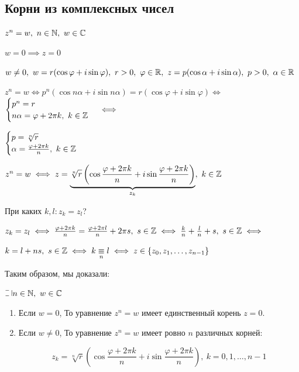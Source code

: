\begin{normalsize}

\section{Корни из комплексных чисел}

$z^n = w,~n \in \mathbb{N},~w \in \mathbb{C}$

$w = 0 \implies z = 0$

$w \neq 0,~w = r (\cos \varphi + i \sin \varphi),~r > 0,~\varphi \in \mathbb{R},~z = p (\cos \alpha + i \sin \alpha),~p > 0,~\alpha \in \mathbb{R}$

$z^n = w \iff p^n (\cos n \alpha + i \sin n \alpha) = r (\cos \varphi + i \sin \varphi) \iff$
$\begin{cases}
    p^n = r\\
    n \alpha = \varphi + 2 \pi k,~k \in \mathbb{Z}
\end{cases} \iff$

$\begin{cases}
    p = \sqrt[n]{r}\\
    \alpha = \frac{\varphi + 2 \pi k}{n},~k \in \mathbb{Z}
\end{cases}$

$z^n = w \iff z = \underbrace{\sqrt[n]{r} \left(\cos \frac{\varphi + 2 \pi k}{n} + i \sin \frac{\varphi + 2 \pi k}{n}\right)}_{z_k},~k \in \mathbb{Z}$

При каких $k, l: z_k = z_l$?

$z_k = z_l \iff \frac{\varphi + 2 \pi k}{n} = \frac{\varphi + 2 \pi l}{n} + 2 \pi s,~s \in \mathbb{Z} \iff \frac{k}{n} + \frac{l}{n} + s,~s \in \mathbb{Z} \iff $  

$k = l + ns,~s \in \mathbb{Z} \iff k \underset{n}{\equiv} l \iff z \in \{z_0, z_1, \ldots, z_{n-1}\}$

Таким образом, мы доказали:

\begin{theorem}
    $\letus n \in \mathN,~w \in \mathC$

    \begin{enumerate}
        \item Если $w = 0$, То уравнение $z^n = w$ имеет единственный корень $z = 0$.
        
        \item Если $w \neq 0$, То уравнение $z^n = w$ имеет ровно $n$ различных корней:
    
        \[ z_k = \sqrt[n]{r} \left(\cos \frac{\varphi + 2 \pi k}{n} + i \sin \frac{\varphi + 2 \pi k}{n}\right),~k = 0, 1, \ldots, n-1 \]


\end{enumerate}
\end{theorem}
\end{normalsize}
